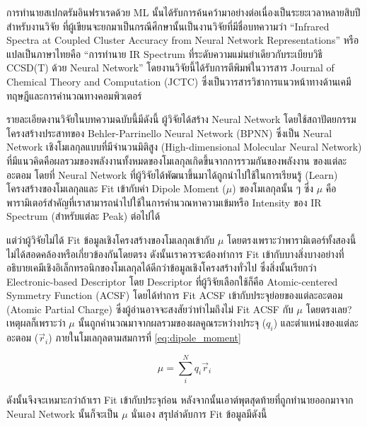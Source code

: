 การทำนายสเปกตรัมอินฟราเรดด้วย ML นั้นได้รับการค้นคว้ามาอย่างต่อเนื่องเป็นระยะเวลาหลายสิบปี\autocite{gastegger2017} สำหรับงานวิจัย%
ที่ผู้เขียนจะยกมาเป็นกรณีศึกษานั้นเป็นงานวิจัยที่มีชื่อบทความว่า \enquote{Infrared Spectra at Coupled Cluster Accuracy from Neural 
Network Representations} หรือแปลเป็นภาษาไทยคือ \enquote{การทำนาย IR Spectrum ที่ระดับความแม่นยำเดียวกับระเบียบวิธี CCSD(T) 
ด้วย Neural Network}\autocite{beckmann2022} โดยงานวิจัยนี้ได้รับการตีพิมพ์ในวารสาร Journal of Chemical Theory and Computation 
(JCTC) ซึ่งเป็นวารสารวิชาการแนวหน้าทางด้านเคมีทฤษฎีและการคำนวณทางคอมพิวเตอร์ 

รายละเอียดงานวิจัยในบทความฉบับนี้มีดังนี้ ผู้วิจัยได้สร้าง Neural Network โดยใช้สถาปัตยกรรมโครงสร้างประสาทของ Behler-Parrinello 
Neural Network (BPNN)\autocite{behler2007,behler2011b,behler2015} ซึ่งเป็น Neural Network เชิงโมเลกุลแบบที่มีจำนวนมิติสูง 
(High-dimensional Molecular Neural Network) ที่มีแนวคิดคือผลรวมของพลังงานทั้งหมดของโมเลกุลเกิดขึ้นจากการรวมกันของพลังงาน%
ของแต่ละอะตอม โดยที่ Neural Network ที่ผู้วิจัยได้พัฒนาขึ้นมาได้ถูกนำไปใช้ในการเรียนรู้ (Learn) โครงสร้างของโมเลกุลและ Fit เข้ากับค่า 
Dipole Moment ($\mu$) ของโมเลกุลนั้น ๆ ซึ่ง $\mu$ คือพารามิเตอร์สำคัญที่เราสามารถนำไปใช้ในการคำนวณหาความเข้มหรือ Intensity 
ของ IR Spectrum (สำหรับแต่ละ Peak) ต่อไปได้

แต่ว่าผู้วิจัยไม่ได้ Fit ข้อมูลเชิงโครงสร้างของโมเลกุลเข้ากับ $\mu$ โดยตรงเพราะว่าพารามิเตอร์ทั้งสองนี้ไม่ได้สอดคล้องหรือเกี่ยวข้องกันโดยตรง 
ดังนั้นเราควรจะต้องทำการ Fit เข้ากับบางสิ่งบางอย่างที่อธิบายเคมีเชิงอิเล็กทรอนิกของโมเลกุลได้ดีกว่าข้อมูลเชิงโครงสร้างทั่วไป ซึ่งสิ่งนั้นเรียกว่า 
Electronic-based Descriptor โดย Descriptor ที่ผู้วิจัยเลือกใช้ก็คือ Atomic-centered Symmetry Function (ACSF) โดยได้ทำการ 
Fit ACSF เข้ากับประจุย่อยของแต่ละอะตอม (Atomic Partial Charge) ซึ่งผู้อ่านอาจจะสงสัยว่าทำไมถึงไม่ Fit ACSF กับ $\mu$ โดยตรงเลย? 
เหตุผลก็เพราะว่า $\mu$ นั้นถูกคำนวณมาจากผลรวมของผลคูณระหว่างประจุ ($q_{i}$) และตำแหน่งของแต่ละอะตอม ($\vec{r}_{i}$) 
ภายในโมเลกุลตามสมการที่ \ref{eq:dipole_moment}

\begin{equation}\label{eq:dipole_moment}
    \mu = \sum^{N}_{i} q_{i}\vec{r}_{i}
\end{equation}

\noindent ดังนั้นจึงจะเหมาะกว่าถ้าเรา Fit เข้ากับประจุก่อน หลังจากนั้นเอาต์พุตสุดท้ายที่ถูกทำนายออกมาจาก Neural Network นั้นก็จะเป็น 
$\mu$ นั่นเอง สรุปลำดับการ Fit ข้อมูลมีดังนี้ 


